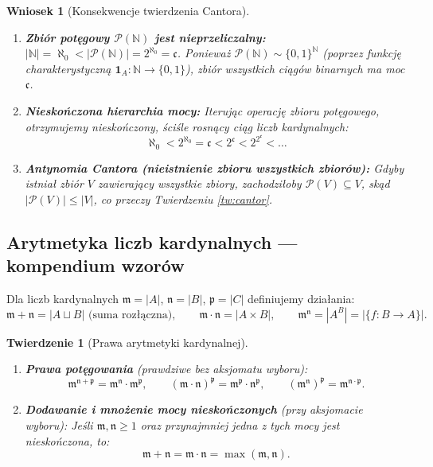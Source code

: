 \documentclass[11pt, a4paper]{article}
\theoremstyle{definition}
\theoremstyle{plain}
\newtheorem{twierdzenie}[definicja]{Twierdzenie}
\newtheorem{wniosek}[definicja]{Wniosek}
\theoremstyle{remark}
\begin{document}
\begin{wniosek}[Konsekwencje twierdzenia Cantora]
\begin{enumerate}
    \item \textbf{Zbiór potęgowy $\mathcal{P}(\mathbb{N})$ jest nieprzeliczalny:} $|\mathbb{N}| = \aleph_0 < |\mathcal{P}(\mathbb{N})| = 2^{\aleph_0} = \mathfrak{c}$. Ponieważ $\mathcal{P}(\mathbb{N}) \sim \{0, 1\}^{\mathbb{N}}$ (poprzez funkcję charakterystyczną $\mathbf{1}_A : \mathbb{N} \to \{0, 1\}$), zbiór wszystkich ciągów binarnych ma moc $\mathfrak{c}$.
    \item \textbf{Nieskończona hierarchia mocy:} Iterując operację zbioru potęgowego, otrzymujemy nieskończony, ściśle rosnący ciąg liczb kardynalnych:
    \[
        \aleph_0 < 2^{\aleph_0} = \mathfrak{c} < 2^{\mathfrak{c}} < 2^{2^{\mathfrak{c}}} < \dots
    \]
    \item \textbf{Antynomia Cantora (nieistnienie zbioru wszystkich zbiorów):} Gdyby istniał zbiór $V$ zawierający wszystkie zbiory, zachodziłoby $\mathcal{P}(V) \subseteq V$, skąd $|\mathcal{P}(V)| \le |V|$, co przeczy Twierdzeniu \ref{tw:cantor}.
\end{enumerate}
\end{wniosek}

\subsection{Arytmetyka liczb kardynalnych — kompendium wzorów}

Dla liczb kardynalnych $\mathfrak{m} = |A|$, $\mathfrak{n} = |B|$, $\mathfrak{p} = |C|$ definiujemy działania:
\[
    \mathfrak{m} + \mathfrak{n} = |A \sqcup B| \text{ (suma rozłączna)}, \qquad
    \mathfrak{m} \cdot \mathfrak{n} = |A \times B|, \qquad
    \mathfrak{m}^{\mathfrak{n}} = |A^B| = |\{f : B \to A\}|.
\]

\begin{twierdzenie}[Prawa arytmetyki kardynalnej]
\begin{enumerate}
    \item \textbf{Prawa potęgowania} (prawdziwe bez aksjomatu wyboru):
    \[
        \mathfrak{m}^{\mathfrak{n} + \mathfrak{p}} = \mathfrak{m}^{\mathfrak{n}} \cdot \mathfrak{m}^{\mathfrak{p}}, \qquad
        (\mathfrak{m} \cdot \mathfrak{n})^{\mathfrak{p}} = \mathfrak{m}^{\mathfrak{p}} \cdot \mathfrak{n}^{\mathfrak{p}}, \qquad
        (\mathfrak{m}^{\mathfrak{n}})^{\mathfrak{p}} = \mathfrak{m}^{\mathfrak{n} \cdot \mathfrak{p}}.
    \]
    \item \textbf{Dodawanie i mnożenie mocy nieskończonych} (przy aksjomacie wyboru): Jeśli $\mathfrak{m}, \mathfrak{n} \ge 1$ oraz przynajmniej jedna z tych mocy jest nieskończona, to:
    \[
        \mathfrak{m} + \mathfrak{n} = \mathfrak{m} \cdot \mathfrak{n} = \max(\mathfrak{m}, \mathfrak{n}).
    \]
\end{enumerate}
\end{twierdzenie}
\end{document}
